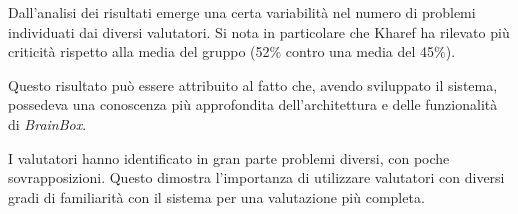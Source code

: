 \vspace{0.3cm}

Dall'analisi dei risultati emerge una certa variabilità nel numero di problemi individuati dai diversi valutatori. Si nota in particolare che Kharef ha rilevato più criticità rispetto alla media del gruppo (52\% contro una media del 45\%). 

Questo risultato può essere attribuito al fatto che, avendo sviluppato il sistema, possedeva una conoscenza più approfondita dell'architettura e delle funzionalità di \textit{BrainBox}.

I valutatori hanno identificato in gran parte problemi diversi, con poche sovrapposizioni. 
Questo dimostra l'importanza di utilizzare valutatori con diversi gradi di familiarità 
con il sistema per una valutazione più completa.